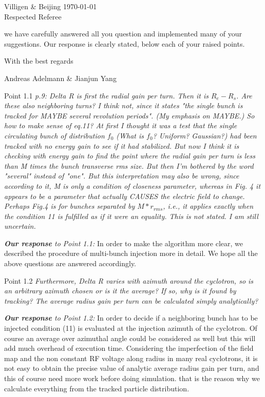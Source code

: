 \documentclass[10pt]{report}
\begin{document}
 Villigen \& Beijing \today \\
 
 Respected Referee
 
 we have carefully answered all you question and implemented many
 of your suggestions. Our response is clearly stated, below each of your raised points.
 
 With the best regards

Andreas Adelmann \& Jianjun Yang

Point 1.1 
{\it p.9: Delta R is first the radial gain per turn. Then it is $R_e-R_s$. Are
these also neighboring turns? I think not, since it states "the single
bunch is tracked for MAYBE several revolution periods". (My emphasis on
MAYBE.) So how to make sense of eq.11? At first I thought it was a test
that the single circulating bunch of distribution $f_0$ (What is $f_0$?
Uniform? Gaussian?) had been tracked with no energy gain to see if it
had stabilized. But now I think it is checking with energy gain to find
the point where the radial gain per turn is less than M times the bunch
transverse rms size. But then I'm bothered by the word "several" instead
of "one". But this interpretation may also be wrong, since according to it, M is
only a condition of closeness parameter, whereas in Fig. 4 it appears to
be a parameter that actually CAUSES the electric field to
change. Perhaps Fig.4 is for bunches separated by $M*r_{rms}$, i.e., it
applies exactly when the condition 11 is fulfilled as if it were an
equality. This is not stated. I am still uncertain.}

{\it {\bf Our response} to Point 1.1: } In order to make the algorithm more clear,
we described the procedure of multi-bunch injection more in detail. 
We hope all the above questions are answered accordingly.

Point 1.2
{\it Furthermore, Delta R varies with azimuth around the cyclotron, so is an
arbitrary azimuth chosen or is it the average? If so, why is it found by
tracking? The average radius gain per turn can be calculated simply
analytically? }

{\it {\bf Our response} to Point 1.2: } In order to decide if a neighboring bunch has to be injected condition (11) is evaluated at the injection azimuth of the cyclotron. 
Of course an average over azimuthal angle could be considered as well but this will add much overhead of execution time.
Considering the imperfection of the field map and the non constant RF voltage along radius in many real cyclotrons, 
it is not easy to obtain the precise value of analytic average radius gain per turn, and this of course need more work before doing simulation.
that is the reason why we calculate everything from the tracked particle distribution.
\end{document}
